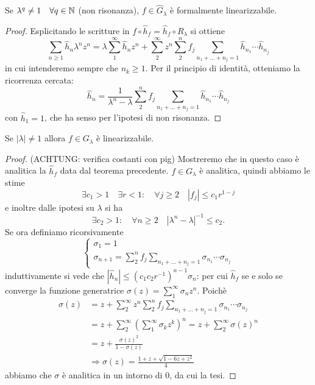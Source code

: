 \begin{teo} Se $\lambda^q\neq 1 \quad \forall q\in\mathbb{N}$ (non risonanza), $f\in \hat G_\lambda$ è formalmente linearizzabile.\end{teo}
\begin{proof} Esplicitando le scritture in $f\circ\hat h_f=\hat h_f\circ R_\lambda$ si ottiene
 \[\sum_{n\geq 1} \hat h_n \lambda^nz^n=\lambda\sum_1^\infty\hat h_nz^n+\sum_2^\infty z^n\sum_2^n f_j \sum_{n_1+\dots+n_j=1}\hat h_{n_1}\cdots\hat h_{n_j} \]
 in cui intenderemo sempre che $n_k\geq 1$. Per il principio di identità, otteniamo la ricorrenza cercata:
 \[\hat h_n=\frac{1}{\lambda^n-\lambda}\sum_2^n f_j\sum_{n_1+\dots+n_j=1}\hat h_{n_1}\cdots\hat h_{n_j}\]
 con $\hat h_1=1$, che ha senso per l'ipotesi di non risonanza.
\end{proof}

\begin{teo} Se $|\lambda|\neq 1$ allora $f\in G_\lambda$ è linearizzabile.\end{teo}
\begin{proof} (ACHTUNG: verifica costanti con pig)
Mostreremo che in questo caso è analitica la $\hat h_f$ data dal teorema precedente.
 $f\in G_\lambda$ è analitica, quindi abbiamo le stime
 \[\exists c_1>1 \quad \exists r<1 : \quad \forall j\geq 2 \quad |f_j|\leq c_1 r^{1-j}\]
 e inoltre dalle ipotesi su $\lambda$ si ha
 \[\exists c_2>1: \quad \forall n\geq 2 \quad |\lambda^n-\lambda|^{-1}\leq c_2.\]
 Se ora definiamo ricorsivamente
 \[\begin{cases}
       \sigma_1=1\\
       \sigma_{n+1}=\sum_2^n f_j\sum_{n_1+\dots+n_j=1}\sigma_{n_1}\cdots\sigma_{n_j} 
   \end{cases}\]
 induttivamente si vede che $|\hat h_n|\leq (c_1 c_2 r^{-1})^{n-1}\sigma_n$: per cui $\hat h_f$ se e solo se converge la funzione generatrice $\sigma(z)=\sum_1^\infty \sigma_n z^n$. Poichè
 \[\begin{split}
 \sigma(z)&=z+\sum_2^\infty z^n \sum_2^n f_j\sum_{n_1+\dots+n_j=1}\sigma_{n_1}\cdots\sigma_{n_j}\\
	  &=z+\sum_2^\infty \left(\sum_1^\infty \sigma_k z^k\right)^n=z+\sum_2^\infty \sigma(z)^n\\
	  &=z+\frac{\sigma(z)^2}{1-\sigma(z)}\\
	  &\Longrightarrow \sigma(z)=\frac{1+z+\sqrt{1-6z+z^2}}{4}
 \end{split}\]
 abbiamo che $\sigma$ è analitica in un intorno di $0$, da cui la tesi. 
\end{proof}

